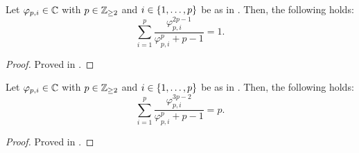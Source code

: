 \documentclass{article}
\begin{document}
    \begin{corollary} \label{cor:A-7}
      Let $\varphi_{p, i} \in \mathbb C$ with $p \in \mathbb{Z}_{\geq 2}$ and $i \in \{1, \dots, p\}$ be as in . Then, the following holds:
      \begin{equation} 
        \sum_{i=1}^{p} \frac{\varphi_{p, i}^{2p-1}}{\varphi_{p, i}^{p}+p-1} = 1.
      \end{equation}
    \end{corollary}

    \begin{proof}
      Proved in .
    \end{proof}

    \begin{corollary} \label{cor:A-8}
      Let $\varphi_{p, i} \in \mathbb C$ with $p \in \mathbb{Z}_{\geq 2}$ and $i \in \{1, \dots, p\}$ be as in . Then, the following holds:
      \begin{equation} 
        \sum_{i=1}^{p} \frac{\varphi_{p, i}^{3p-2}}{\varphi_{p, i}^{p}+p-1} = p.
      \end{equation}
    \end{corollary}

    \begin{proof}
      Proved in .
    \end{proof}



\end{document}
